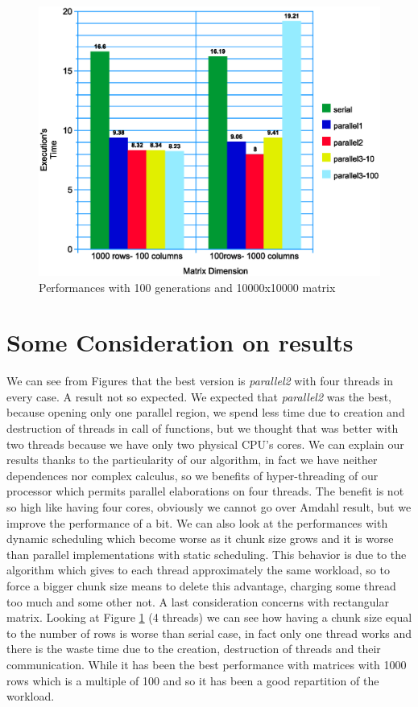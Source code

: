 \documentclass[a4paper,11pt,twoside]{report}
\begin{document}
\begin{figure}
	\centering
	\includegraphics[scale = 0.5]{matdim.eps}
	\caption{Performances with 100 generations and 10000x10000 matrix} \label{fig:7}
\end{figure}

\section{Some Consideration on results}
We can see from Figures that the best version is \emph{parallel2} with four threads in every case. A result not so expected. We expected that \emph{parallel2} was the best, because opening only one parallel region, we spend less time due to creation and destruction of threads in call of functions, but we thought that was better with two threads because we have only two physical CPU's cores. We can explain our results thanks to the particularity of our algorithm, in fact we have neither dependences nor complex calculus, so we benefits of hyper-threading of our processor which permits parallel elaborations on four threads. The benefit is not so high like having four cores, obviously we cannot go over Amdahl result, but we improve the performance of a bit.
We can also look at the performances with dynamic scheduling which become worse as it chunk size grows and it is worse than parallel implementations with static scheduling. This behavior is due to
the algorithm which gives to each thread approximately the same workload, so to force a bigger chunk size means to delete this advantage, charging some thread too much and some other not.
A last consideration concerns with rectangular matrix. Looking at Figure \ref{fig:7} (4 threads) we can see how having a chunk size equal to the number of rows is worse than serial case, in fact only one thread works and there is the waste time due to the creation, destruction of threads and their communication. While it has been the best performance with matrices with 1000 rows which is a multiple of 100 and so it has been a good repartition of the workload.
\end{document}
